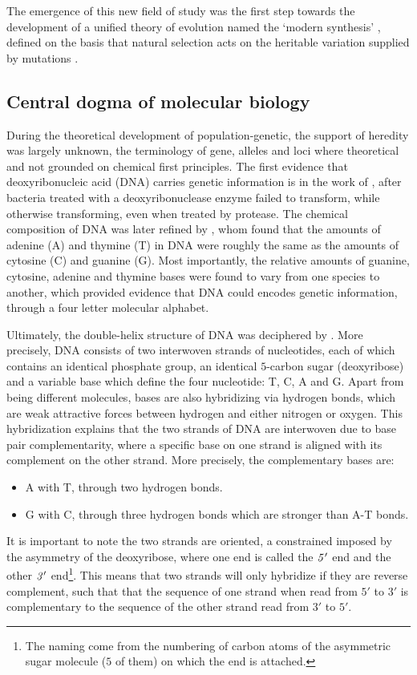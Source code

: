 The emergence of this new field of study was the first step towards the development of a unified theory of evolution named the ‘modern synthesis’ \citep{huxley1942evolution}, defined on the basis that natural selection acts on the heritable variation supplied by mutations \citep{mayr1959where,stebbins1966processes,dobzhansky1974chance}.

\subsection{Central dogma of molecular biology}
During the theoretical development of population-genetic, the support of heredity was largely unknown, the terminology of gene, alleles and loci where theoretical and not grounded on chemical first principles.
The first evidence that deoxyribonucleic acid (\acrshort{DNA}) carries genetic information is in the work of \citet{Avery1944}, after bacteria treated with a deoxyribonuclease enzyme failed to transform, while otherwise transforming, even when treated by protease.
The chemical composition of \acrshort{DNA} was later refined by \citet{Chargaff1950}, whom found that the amounts of adenine (A) and thymine (T) in \acrshort{DNA} were roughly the same as the amounts of cytosine (C) and guanine (G).
Most importantly, the relative amounts of guanine, cytosine, adenine and thymine bases were found to vary from one species to another, which provided evidence that \acrshort{DNA} could encodes genetic information, through a four letter molecular alphabet.

Ultimately, the double-helix structure of \acrshort{DNA} was deciphered by \citet{franklin1953molecular,watson1953molecular,wilkins1953molecular}.
More precisely, \acrshort{DNA} consists of two interwoven strands of nucleotides, each of which contains an identical phosphate group, an identical $5$-carbon sugar (deoxyribose) and a variable base which define the four nucleotide: T, C, A and G.
Apart from being different molecules, bases are also hybridizing via hydrogen bonds, which are weak attractive forces between hydrogen and either nitrogen or oxygen.
This hybridization explains that the two strands of \acrshort{DNA} are interwoven due to base pair complementarity, where a specific base on one strand is aligned with its complement on the other strand.
More precisely, the complementary bases are:
\begin{itemize}
	\item A with T, through two hydrogen bonds.
	\item G with C, through three hydrogen bonds which are stronger than A-T bonds. 
\end{itemize}
It is important to note the two strands are oriented, a constrained imposed by the asymmetry of the deoxyribose, where one end is called the ${\it 5}'$ end and the other ${\it 3}'$ end\footnote{The naming come from the numbering of carbon atoms of the asymmetric sugar molecule ($5$ of them) on which the end is attached.}. 
This means that two strands will only hybridize if they are reverse complement, such that that the sequence of one strand when read from $5'$ to $3'$ is complementary to the sequence of the other strand read from $3'$ to $5'$.

